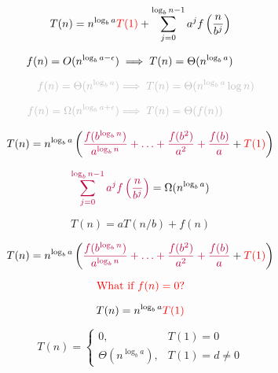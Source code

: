 \begin{frame}{}
  \[
    T(n) = n^{\log_{b}{a}} \textcolor{red}{T(1)} + 
        \sum_{j = 0}^{\log_{b}{n} - 1} a^{j} f\left(\frac{n}{b^{j}}\right)
  \]

  \begin{align*}
    f(n) = O(n^{\log_{b}{a} - \epsilon}) &\implies T(n) = \Theta(n^{\log_{b}{a}}) 
    \\[6pt]
    \gray{f(n) = \Theta(n^{\log_{b}{a}})} &\gray{\implies T(n) = \Theta(n^{\log_{b}{a}} \log n)}
    \\[6pt]
    \gray{f(n) = \Omega(n^{\log_{b}{a} + \epsilon})} &\gray{\implies T(n) = \Theta(f(n))}
  \end{align*}

  \pause
  \[
    T(n) = n^{\log_{b}{a}} \left( \textcolor{purple}{\frac{f(b^{\log_{b}{n}})}{a^{\log_{b}{n}}} + \ldots 
        + \frac{f(b^2)}{a^2} + \frac{f(b)}{a}} + \textcolor{red}{T(1)} \right)
  \]

  \begin{center}
  \end{center}

  \[
    \textcolor{purple}{\sum_{j = 0}^{\log_{b}{n} - 1} a^{j} f\left(\frac{n}{b^{j}}\right)} = \Omega(n^{\log_{b}{a}})
  \]
\end{frame}

\begin{frame}{}
  \[
    T(n) = a T(n/b) + f(n)
  \]

  \[
    T(n) = n^{\log_{b}{a}} \left( \textcolor{purple}{\frac{f(b^{\log_{b}{n}})}{a^{\log_{b}{n}}} + \ldots + \frac{f(b^2)}{a^2} + \frac{f(b)}{a}} + \textcolor{red}{T(1)} \right)
  \]

  \pause
  \vspace{0.30cm}
  \[
    \textcolor{red}{\text{What if } f(n) = 0?}
  \]

  \pause
  \[
    T(n) = n^{\log_{b}{a}} \textcolor{red}{T(1)}
  \]

  \pause
  \[
    T(n) = \begin{cases}
      0, & T(1) = 0 \\[5pt]
      \Theta(n^{\log_{b}{a}}), & T(1) = d \neq 0
    \end{cases}
  \]
\end{frame}


